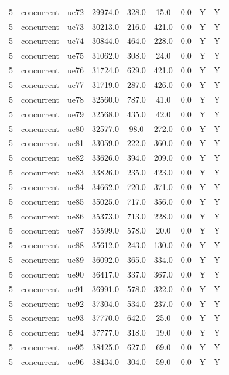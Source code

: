 \begin{table}[ht]
\begin{tabular}{|c|c|c|c|c|c|c|c|c|}
5 & concurrent & ue72 & 29974.0 & 328.0 & 15.0 & 0.0 & Y & Y \\
5 & concurrent & ue73 & 30213.0 & 216.0 & 421.0 & 0.0 & Y & Y \\
5 & concurrent & ue74 & 30844.0 & 464.0 & 228.0 & 0.0 & Y & Y \\
5 & concurrent & ue75 & 31062.0 & 308.0 & 24.0 & 0.0 & Y & Y \\
5 & concurrent & ue76 & 31724.0 & 629.0 & 421.0 & 0.0 & Y & Y \\
5 & concurrent & ue77 & 31719.0 & 287.0 & 426.0 & 0.0 & Y & Y \\
5 & concurrent & ue78 & 32560.0 & 787.0 & 41.0 & 0.0 & Y & Y \\
5 & concurrent & ue79 & 32568.0 & 435.0 & 42.0 & 0.0 & Y & Y \\
5 & concurrent & ue80 & 32577.0 & 98.0 & 272.0 & 0.0 & Y & Y \\
5 & concurrent & ue81 & 33059.0 & 222.0 & 360.0 & 0.0 & Y & Y \\
5 & concurrent & ue82 & 33626.0 & 394.0 & 209.0 & 0.0 & Y & Y \\
5 & concurrent & ue83 & 33826.0 & 235.0 & 423.0 & 0.0 & Y & Y \\
5 & concurrent & ue84 & 34662.0 & 720.0 & 371.0 & 0.0 & Y & Y \\
5 & concurrent & ue85 & 35025.0 & 717.0 & 356.0 & 0.0 & Y & Y \\
5 & concurrent & ue86 & 35373.0 & 713.0 & 228.0 & 0.0 & Y & Y \\
5 & concurrent & ue87 & 35599.0 & 578.0 & 20.0 & 0.0 & Y & Y \\
5 & concurrent & ue88 & 35612.0 & 243.0 & 130.0 & 0.0 & Y & Y \\
5 & concurrent & ue89 & 36092.0 & 365.0 & 334.0 & 0.0 & Y & Y \\
5 & concurrent & ue90 & 36417.0 & 337.0 & 367.0 & 0.0 & Y & Y \\
5 & concurrent & ue91 & 36991.0 & 578.0 & 322.0 & 0.0 & Y & Y \\
5 & concurrent & ue92 & 37304.0 & 534.0 & 237.0 & 0.0 & Y & Y \\
5 & concurrent & ue93 & 37770.0 & 642.0 & 25.0 & 0.0 & Y & Y \\
5 & concurrent & ue94 & 37777.0 & 318.0 & 19.0 & 0.0 & Y & Y \\
5 & concurrent & ue95 & 38425.0 & 627.0 & 69.0 & 0.0 & Y & Y \\
5 & concurrent & ue96 & 38434.0 & 304.0 & 59.0 & 0.0 & Y & Y \\

\end{tabular}
\end{table}
